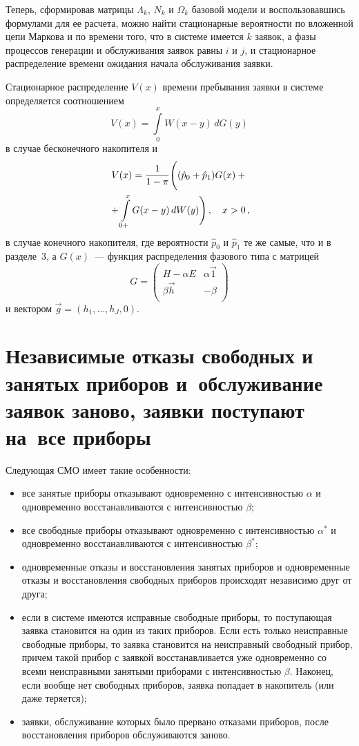 \begin{multicols}{2}
Теперь, сформировав матрицы $\Lambda_k$, $N_k$ и $\Omega_k$
базовой модели и воспользовавшись формулами для ее расчета,
можно найти стационарные вероятности по вложенной цепи Маркова
и по времени того, что в системе имеется $k$ заявок, а фазы
процессов генерации и обслуживания заявок равны $i$ и $j$, и
стационарное распределение времени ожидания начала обслуживания
заявки.

Стационарное распределение $V(x)$ времени пребывания заявки
в системе определяется соотношением
\begin{equation}
\label{V_x_2}
V(x) =
\int\limits_0^x
W(x-y)\, dG(y)
\end{equation}
в случае бесконечного накопителя и
\begin{multline}
\label{Vx3}
V(x) =
\displaystyle\frac{\displaystyle 1\mathstrut}{\displaystyle 1-\pi\mathstrut}
\Bigg(
(\hat p_0 + \hat p_1) G(x)+{}\\
{}+
\int\limits_{0+}^{x}
G(x-y)\, dW(y)
\Bigg)\,,
\quad x>0\,,
\end{multline}
в случае конечного накопителя,
где
вероятности $\hat p_0$ и $\hat p_1$ те же самые, что и в
разделе~3,
а $G(x)$~--- функция распределения фазового типа с матрицей
$$
G=
\begin{pmatrix}
H-\alpha E       &  \alpha \vec1  \\
\beta \vec h     &  - \beta        \\
\end{pmatrix}
$$
и вектором
$\vec g = (h_1,\ldots, h_J,0)$.

\section{Независимые отказы свободных и занятых приборов
и~обслуживание заявок заново, заявки поступают на~все приборы}       %

Следующая СМО имеет такие особенности:
\begin{itemize}
\item все занятые приборы отказывают одновременно с интенсивностью $\alpha$
и одновременно восстанавливаются с интенсивностью $\beta$;
\item
все свободные приборы отказывают одновременно с интенсивностью
$\alpha^*$ и одновременно восстанавливаются с интенсивностью $\beta^*$;
\item
 одновременные отказы и восстановления занятых приборов и
одновременные отказы и восстановления свободных приборов
происходят независимо друг от друга;
\item
если в системе имеются исправные свободные приборы, то поступающая
заявка становится на один из таких приборов.
Если есть только неисправные свободные приборы, то заявка становится
на неисправный свободный прибор, причем такой прибор с заявкой
восстанавливается уже одновременно со всеми неисправными занятыми
приборами с интенсивностью $\beta$.
Наконец, если вообще нет
свободных приборов, заявка попадает в накопитель (или даже теряется);
\item
заявки, обслуживание которых было прервано отказами приборов,
после восстановления приборов обслуживаются заново.
\end{itemize}


\end{multicols}
